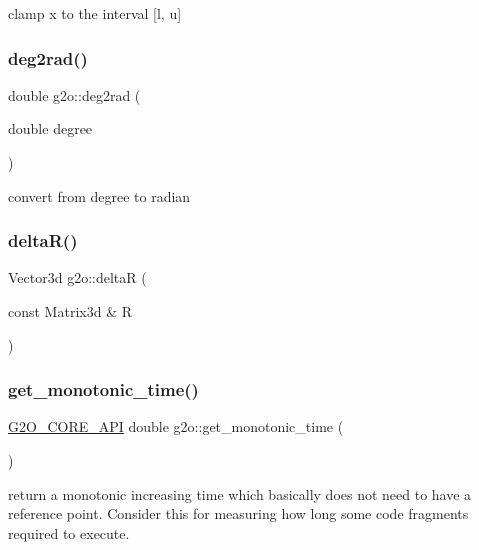 clamp x to the interval \mbox{[}l, u\mbox{]} \mbox{\label{namespaceg2o_a8f29adce7d7b9855e1d0ba43835c34b3}} 
\subsubsection{\texorpdfstring{deg2rad()}{deg2rad()}}
{\footnotesize\ttfamily double g2o\+::deg2rad (\begin{DoxyParamCaption}\item[{double}]{degree }\end{DoxyParamCaption})\hspace{0.3cm}{\ttfamily [inline]}}

convert from degree to radian \mbox{\label{namespaceg2o_a2e39915fb420fd7dc2d3802435e4a6a9}} 
\subsubsection{\texorpdfstring{delta\+R()}{deltaR()}}
{\footnotesize\ttfamily Vector3d g2o\+::deltaR (\begin{DoxyParamCaption}\item[{const Matrix3d \&}]{R }\end{DoxyParamCaption})\hspace{0.3cm}{\ttfamily [inline]}}

\mbox{\label{namespaceg2o_af1595a641cd3ed21c3d9739c72a39422}} 
\subsubsection{\texorpdfstring{get\+\_\+monotonic\+\_\+time()}{get\_monotonic\_time()}}
{\footnotesize\ttfamily \mbox{\hyperlink{g2o__core__api_8h_a7a8d7648d6f1e26632566f335751d064}{G2\+O\+\_\+\+C\+O\+R\+E\+\_\+\+A\+PI}} double g2o\+::get\+\_\+monotonic\+\_\+time (\begin{DoxyParamCaption}{ }\end{DoxyParamCaption})}

return a monotonic increasing time which basically does not need to have a reference point. Consider this for measuring how long some code fragments required to execute.

